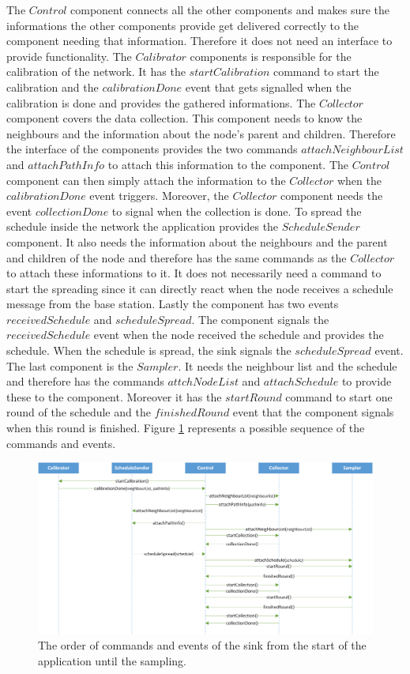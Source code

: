 The $Control$ component connects all the other components and makes sure the informations the other components provide get delivered correctly to the component needing that information. Therefore it does not need an interface to provide functionality.     
The $Calibrator$ components is responsible for the calibration of the network. It has the $startCalibration$ command to start the calibration and the $calibrationDone$ event that gets signalled when the calibration is done and provides the gathered informations. The $Collector$ component covers the data collection. This component needs to know the neighbours and the information about the node's parent and children. Therefore the interface of the components provides the two commands $attachNeighbourList$ and $attachPathInfo$ to attach this information to the component. The $Control$ component can then simply attach the information to the $Collector$ when the $calibrationDone$ event triggers. Moreover, the $Collector$ component needs the event $collectionDone$ to signal when the collection is done. To spread the schedule inside the network the application provides the $ScheduleSender$ component. It also needs the information about the neighbours and the parent and children of the node and therefore has the same commands as the $Collector$ to attach these informations to it. It does not necessarily need a command to start the spreading since it can directly react when the node receives a schedule message from the base station. Lastly the component has two events $receivedSchedule$ and $scheduleSpread$. The component signals the $receivedSchedule$ event when the node received the schedule and provides the schedule. When the schedule is spread, the sink signals the $scheduleSpread$ event. The last component is the $Sampler$. It needs the neighbour list and the schedule and therefore has the commands $attchNodeList$ and $attachSchedule$ to provide these to the component. Moreover it has the $startRound$ command to start one round of the schedule and the $finishedRound$ event that the component signals when this round is finished. Figure \ref{fig:commandEvents} represents a possible sequence of the commands and events.

\begin{figure}[btp]
	\centering
    \includegraphics[scale=0.55]{content/images/Processes/ComandsEvents}
   	\caption{The order of commands and events of the sink from the start of the application until the sampling.}
    \label{fig:commandEvents}
\end{figure}

